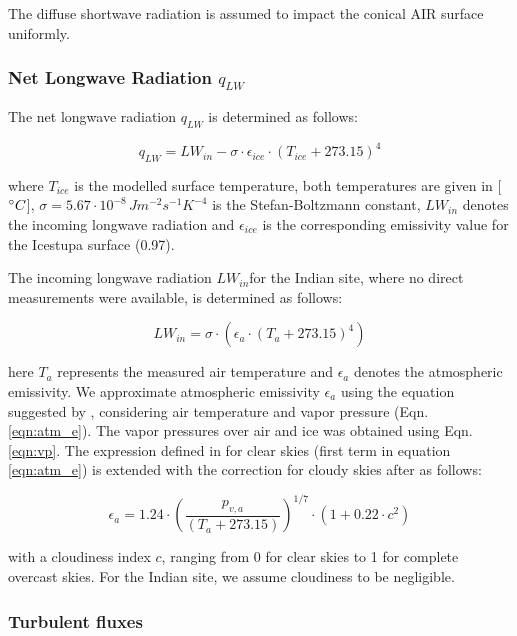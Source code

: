 \documentclass[utf8]{frontiersSCNS} %
\begin{document}
The diffuse shortwave radiation is assumed to impact the conical AIR surface uniformly.

\subsubsection{Net Longwave Radiation \texorpdfstring{$q_{LW}$}{Lg}}

The net longwave radiation $q_{LW}$ is determined as follows:

\begin{equation} q_{LW}= LW_{in}-\sigma \cdot \epsilon_{ice} \cdot {(T_{ice}+ 273.15)}^4
	\label{eqn:LW} \end{equation}

where $T_{ice}$ is the modelled surface temperature, both temperatures are given in [$\degree C$],
$\sigma=5.67\cdot10^{-8}\,Jm^{-2}s^{-1}K^{-4}$ is the Stefan-Boltzmann constant, $LW_{in}$ denotes the incoming longwave
radiation and $\epsilon_{ice}$ is the corresponding emissivity value for the Icestupa surface (0.97).

The incoming longwave radiation $LW_{in}$for the Indian site, where no direct measurements were available, is determined
as follows:

\begin{equation} LW_{in}=\sigma \cdot (\epsilon_a \cdot {(T_a+ 273.15)}^4)
	\label{eqn:LWin} \end{equation}

here $T_a$ represents the measured air temperature and $\epsilon_a$ denotes the atmospheric emissivity. We approximate
atmospheric emissivity $\epsilon_a$ using the equation suggested by \cite{Brutsaert_1982}, considering air temperature
and vapor pressure (Eqn.  \ref{eqn:atm_e}). The vapor pressures over air and ice was obtained using Eqn. \ref{eqn:vp}.
The expression defined in \cite{Brutsaert_1975} for clear skies (first term in equation \ref{eqn:atm_e}) is extended
with the correction for cloudy skies after \cite{Brutsaert_1982} as follows:

\begin{equation} \epsilon_a=1.24 \cdot (\frac{p_{v,a}}{(T_a+273.15)})^{1/7}\cdot(1+0.22\cdot{c}^2) \label{eqn:atm_e}
\end{equation}

with a cloudiness index $c$, ranging from 0 for clear skies to 1 for complete overcast skies. For the Indian site, we
assume cloudiness to be negligible.

\subsubsection{Turbulent fluxes }
\end{document}
